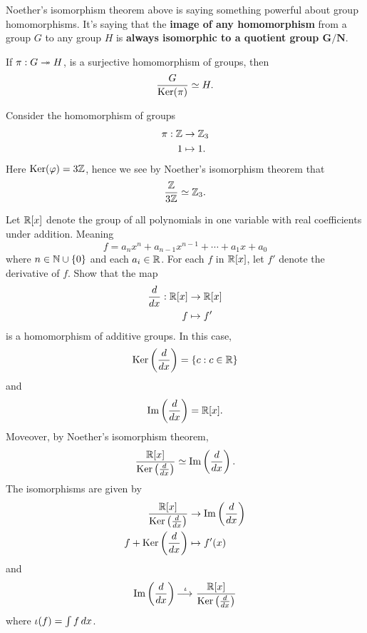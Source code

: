 \documentclass{ximera}
\begin{document}
Noether's isomorphism theorem above is saying something powerful about
group homomorphisms. It's saying that the \textbf{image of any
  homomorphism} from a group $G$ to any group $H$ is \textbf{always
  isomorphic to a quotient group $\boldsymbol{G/N}$}.


\begin{corollary}
  If $\pi:G\twoheadrightarrow H$, is a surjective homomorphism of groups, then
  \[
  \frac{G}{\mathop{\mathrm{Ker}}\nolimits(\pi)} \simeq H.
  \]
\end{corollary}

\begin{example}
  Consider the homomorphism of groups
  \begin{align*}
    \pi:\mathbb Z &\to \mathbb Z_3\\
    1 &\mapsto 1.
  \end{align*}
  Here $\mathop{\mathrm{Ker}}\nolimits(\varphi)= 3\mathbb Z$, hence we see by Noether's isomorphism
  theorem that
  \[
  \frac{\mathbb Z}{3\mathbb Z}\simeq \mathbb Z_3.
  \]
\end{example}



\begin{example}
  Let $\mathbb R[x]$ denote the group of all polynomials in one variable with
  real coefficients under addition. Meaning
  \[
  f = a_nx^{n} + a_{n-1}x^{n-1} + \cdots + a_1x + a_0
  \]
  where $n\in\mathbb N\cup\{0\}$ and each $a_i\in\mathbb R$.  For each $f$ in $\mathbb R[x]$,
  let $f'$ denote the derivative of $f$. Show that the map
  \begin{align*}
    \frac{d}{dx}:\mathbb R[x]&\to\mathbb R[x]\\
    f  &\mapsto f'
  \end{align*}
  is a homomorphism of additive groups.  In this case,
  \[
  \mathop{\mathrm{Ker}}\nolimits\left(\frac{d}{dx}\right) = \{c:c\in \mathbb R\}
  \]
  and
  \[
  \operatorname{Im}\left(\frac{d}{dx}\right) =\mathbb R[x].
  \]
  Moveover, by Noether's isomorphism theorem,
  \[
  \frac{\mathbb R[x]}{\mathop{\mathrm{Ker}}\nolimits\left(\frac{d}{dx}\right)} \simeq \operatorname{Im}\left(\frac{d}{dx}\right).
  \]
  The isomorphisms are given by
  \begin{align*}
    \frac{\mathbb R[x]}{\mathop{\mathrm{Ker}}\nolimits\left(\frac{d}{dx}\right)} &\to \operatorname{Im}\left(\frac{d}{dx}\right)\\
    f+\mathop{\mathrm{Ker}}\nolimits\left(\frac{d}{dx}\right) &\mapsto f'(x)
  \end{align*}
  and
  \[
  \operatorname{Im}\left(\frac{d}{dx}\right) \mathop{\longrightarrow\,}\limits^{\iota}\frac{\mathbb R[x]}{\mathop{\mathrm{Ker}}\nolimits\left(\frac{d}{dx}\right)}
  \]
  where $\iota(f) = \int f \, d x$.
\end{example}
\end{document}
